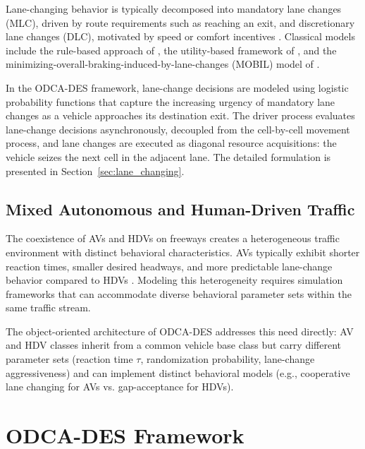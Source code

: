 \documentclass[review,number]{elsarticle}
\begin{document}
Lane-changing behavior is typically decomposed into mandatory lane changes (MLC), driven by route requirements such as reaching an exit, and discretionary lane changes (DLC), motivated by speed or comfort incentives \citep{zheng2014recent}. Classical models include the rule-based approach of \citet{gipps1986model}, the utility-based framework of \citet{toledo2003modeling}, and the minimizing-overall-braking-induced-by-lane-changes (MOBIL) model of \citet{kesting2007general}.

In the ODCA-DES framework, lane-change decisions are modeled using logistic probability functions \citep{demirtas2026lclogistic} that capture the increasing urgency of mandatory lane changes as a vehicle approaches its destination exit. The driver process evaluates lane-change decisions asynchronously, decoupled from the cell-by-cell movement process, and lane changes are executed as diagonal resource acquisitions: the vehicle seizes the next cell in the adjacent lane. The detailed formulation is presented in Section~\ref{sec:lane_changing}.

\subsection{Mixed Autonomous and Human-Driven Traffic}
\label{sec:lit_mixed}

The coexistence of AVs and HDVs on freeways creates a heterogeneous traffic environment with distinct behavioral characteristics. AVs typically exhibit shorter reaction times, smaller desired headways, and more predictable lane-change behavior compared to HDVs \citep{talebpour2016influence, shladover2012impacts, vanarem2006effects}. Modeling this heterogeneity requires simulation frameworks that can accommodate diverse behavioral parameter sets within the same traffic stream.

The object-oriented architecture of ODCA-DES addresses this need directly: AV and HDV classes inherit from a common vehicle base class but carry different parameter sets (reaction time $\tau$, randomization probability, lane-change aggressiveness) and can implement distinct behavioral models (e.g., cooperative lane changing for AVs vs. gap-acceptance for HDVs).


\section{ODCA-DES Framework}
\label{sec:framework}
\end{document}
